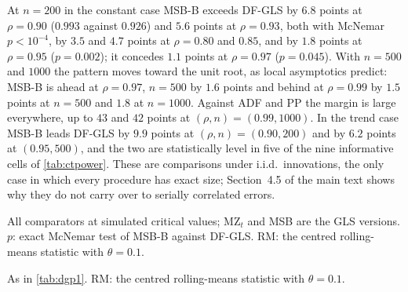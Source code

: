 \documentclass[11pt]{article}
\newcommand{\rw}{Y}
\newcommand{\RMGLS}{MSB-B}
\begin{document}
At $n = 200$ in the constant case \RMGLS{} exceeds DF-GLS by $6.8$ points
at $\rho = 0.90$ ($0.993$ against $0.926$) and $5.6$ points at $\rho =
0.93$, both with McNemar $p < 10^{-4}$, by $3.5$ and $4.7$ points at
$\rho = 0.80$ and $0.85$, and by $1.8$ points at $\rho = 0.95$ ($p =
0.002$); it concedes $1.1$ points at $\rho = 0.97$ ($p = 0.045$). With
$n = 500$ and $1000$ the pattern moves toward the unit root, as local
asymptotics predict: \RMGLS{} is ahead at $\rho = 0.97$, $n = 500$ by $1.6$
points and behind at $\rho = 0.99$ by $1.5$ points at $n = 500$ and $1.8$
at $n = 1000$. Against ADF and PP the margin is large everywhere, up to
$43$ and $42$ points at $(\rho, n) = (0.99, 1000)$. In the trend case
\RMGLS{} leads DF-GLS by $9.9$ points at $(\rho, n) = (0.90, 200)$ and by
$6.2$ points at $(0.95, 500)$, and the two are statistically level in
five of the nine informative cells of \cref{tab:ctpower}. These are
comparisons under i.i.d.\ innovations, the only case in which every
procedure has exact size; Section~4.5 of the main text shows why they do not carry
over to serially correlated errors.

\begin{table}[t]
\centering
\caption{Power against $\rw_t = \rho\rw_{t-1} + \varepsilon_t$, constant
case, at equalized size, $\alpha = 0.05$.}
\label{tab:dgp1}
\begin{threeparttable}
\small

\begin{tablenotes}\footnotesize
\item All comparators at simulated critical values; MZ$_t$ and MSB are
the GLS versions. $p$: exact McNemar test of \RMGLS{} against DF-GLS. RM: the centred rolling-means statistic with $\theta = 0.1$.
\end{tablenotes}
\end{threeparttable}
\end{table}

\begin{table}[t]
\centering
\caption{Power against a stationary autoregression around a linear
trend, trend case, at equalized size, $\alpha = 0.05$.}
\label{tab:ctpower}
\begin{threeparttable}
\small

\begin{tablenotes}\footnotesize
\item As in \cref{tab:dgp1}. RM: the centred rolling-means statistic with $\theta = 0.1$.
\end{tablenotes}
\end{threeparttable}
\end{table}
\end{document}
